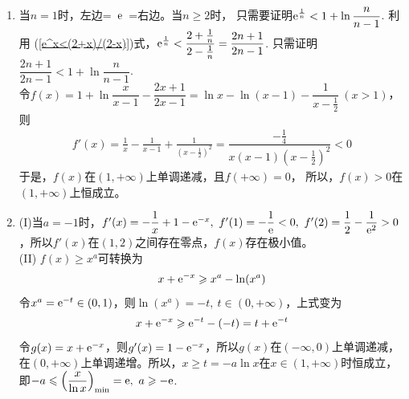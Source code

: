 \begin{enumerate}[label={\textbf{\thechapter.\arabic*}},leftmargin=
    \inteval{\myenumleftmargin}pt]
\item  当$ n=1 $时，左边=\ $ \mathrm{e} $\ =右边。当$ n\geq 2 $时，
只需要证明$ \mathrm{e}^{\frac{1}{n}}<1+\ln \dfrac{n}{n-1} $. 利用
(\ref{e^x<(2+x)/(2-x)})式，$ \mathrm{e}^{\frac{1}{n}}<\dfrac{2+
    \frac{1}{n}}{2-\frac{1}{n}}=\dfrac{2n+1}{2n-1} $.
只需证明$ \dfrac{2n+1}{2n-1}<1+\ln \dfrac{n}{n-1} $. \\
令$ f(x)=1+\ln \dfrac{x}{x-1}-\dfrac{2x+1}{2x-1}=
\ln x-\ln(x-1)-\dfrac{1}{x-\frac{1}{2}}\ (x>1) $，则
\begin{align*}
    f'(x)=\frac{1}{x}-\frac{1}{x-1}+\frac{1}{(x-\frac{1}{2})^2}
    =\dfrac{-\frac{1}{4}}{x(x-1)(x-\frac{1}{2})^2}<0
\end{align*}
于是，$ f(x) $在$ (1,+\infty) $上单调递减，且$ f(+\infty)=0 $，
所以，$ f(x)>0 $在$ (1,+\infty) $上恒成立。

\item (I)当$ a=-1 $时，$ f'(x)=-\dfrac{1}{x}+1-\e^{-x},\ f'(1)=-\dfrac{1}{\e}<0,\ f'(2)=\dfrac{1}{2}-\dfrac{1}{\e^2}>0 $，所以$ f'(x) $在$ (1,2) $之间存在零点，$ f(x) $存在极小值。\\
(II) $ f(x)\geq x^a $可转换为
\begin{gather*}
    x+\mathrm{e}^{-x} \geqslant x^a -\ln (x^a) 	
\end{gather*}
令$ x^a=\mathrm{e}^{-t}\in (0,1) $，则$ \ln (x^a) =-t,\ t\in(0,+\infty) $，上式变为
\begin{gather*}
    x+\mathrm{e}^{-x} \geqslant \mathrm{e}^{-t}-(-t)=t+\mathrm{e}^{-t} 
\end{gather*}
令$ g(x)=x+\mathrm{e}^{-x} $，则$ g'(x)=1-\mathrm{e}^{-x} $，所以$ g(x) $在$ (-\infty,0) $上单调递减，在$ (0,+\infty) $上单调递增。所以，$ x\geq t =-a\ln x $在$ x\in(1,+\infty) $时恒成立，即$ -a\leq \left(\dfrac{x}{\ln x}\right)_{\min}=\e,\ a\geq -\e $. 


\end{enumerate}
